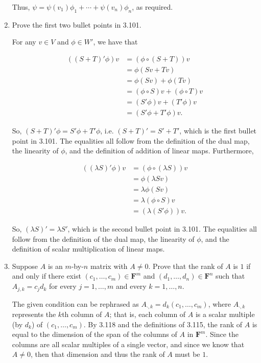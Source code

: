 \documentclass{book}
\begin{document}
\begin{enumerate}
Thus, \(\psi = \psi(v_1)\phi_1 + \dotsm + \psi(v_n)\phi_n\), as required.

\item Prove the first two bullet points in 3.101.

For any \(v \in V\) and \(\phi \in W'\), we have that

\begin{equation*}
    \begin{split}
        ((S+T)'\phi)v &= (\phi \circ (S+T))v \\
        &= \phi(Sv+Tv) \\
        &= \phi(Sv)+\phi(Tv) \\
        &= (\phi \circ S)v + (\phi \circ T)v \\
        &= (S'\phi)v+(T'\phi)v \\
        &= (S'\phi+T'\phi)v.
    \end{split}
\end{equation*}

So, \((S+T)'\phi=S'\phi+T'\phi\), i.e. \((S+T)'=S'+T'\), which is the first bullet point in 3.101.  The equalities all follow from the definition of the dual map, the linearity of \(\phi\), and the definition of addition of linear maps.  Furthermore, 

\begin{equation*}
    \begin{split}
        ((\lambda S)'\phi)v &= (\phi \circ (\lambda S))v \\
        &= \phi(\lambda Sv) \\
        &= \lambda \phi(Sv) \\
        &= \lambda (\phi \circ S)v \\
        &= (\lambda (S'\phi))v.
    \end{split}
\end{equation*}

So, \((\lambda S)'=\lambda S'\), which is the second bullet point in 3.101.  The equalities all follow from the definition of the dual map, the linearity of \(\phi\), and the definition of scalar multiplication of linear maps.

\item Suppose \(A\) is an \(m\)-by-\(n\) matrix with \(A \neq 0\).  Prove that the rank of \(A\) is \(1\) if and only if there exist \((c_1,\dots,c_m) \in \textbf{F}^m\) and  \((d_1,\dots,d_n) \in \textbf{F}^n\) such that \(A_{j,k}=c_jd_k\) for every \(j=1,\dots,m\) and every \(k=1,\dots,n\).

The given condition can be rephrased as \(A_{\cdot,k}=d_k(c_1,\dots,c_m)\), where \(A_{\cdot,k}\) represents the \(k\)th column of \(A\); that is, each column of \(A\) is a scalar multiple (by \(d_k\)) of \((c_1,\dots,c_m)\).  By 3.118 and the definitions of 3.115, the rank of \(A\) is equal to the dimension of the span of the columns of \(A\) in \(\textbf{F}^m\).  Since the columns are all scalar multiples of a single vector, and since we know that \(A \neq 0\), then that dimension and thus the rank of \(A\) must be \(1\).


\end{enumerate}
\end{document}
